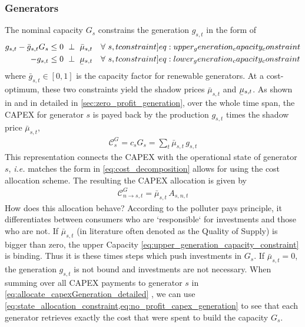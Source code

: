 \documentclass[11pt,twocolumn]{article}
\newcommand{\ie}{\textit{i.e.} }
\newcommand{\ubar}[1]{\underaccent{\bar}{#1}}
\newcommand{\resultsin}[1]{\hspace{6pt} \bot  \hspace{6pt} #1}
\newcommand{\Forall}[1]{\hspace{10pt} \forall \,\, #1 }
\newcommand{\generation}{g_{s,t}}
\newcommand{\generationpotential}{\bar{g}_{s,t}}
\newcommand{\capacitygeneration}{G_{s}}
\newcommand{\capitalpricegeneration}{c_{s}}
\newcommand{\mulowergeneration}{\ubar{\mu}_{s,t}}
\newcommand{\muuppergeneration}{\bar{\mu}_{s,t}}
\newcommand{\capexgeneration}{\mathcal{C}^G}
\newcommand{\allocategeneration}[1][s, n]{A_{#1,t}}
\newcommand{\allocatecapexgeneration}[1][n \rightarrow s]{\capexgeneration_{#1,t}}
\begin{document}
\subsubsection{Generators}

The nominal capacity $\capacitygeneration$ constrains the generation $\generation$ in the form of 
\begin{align}
\generation - \generationpotential \capacitygeneration  &\le 0 \resultsin{\muuppergeneration} \Forall{s,t} 
\label[constraint]{eq:upper_generation_capacity_constraint}\\ 
- \generation &\le 0 \resultsin{\mulowergeneration} \Forall{s,t} 
\label[constraint]{eq:lower_generation_capacity_constraint}
\end{align}
where $\generationpotential \in \left[ 0,1\right]$ is the capacity factor for renewable generators. At a cost-optimum, these two constraints yield the shadow prices $\muuppergeneration$ and $\mulowergeneration$.  As shown in \cite{brown_decreasing_2020} and in detailed in \cref{sec:zero_profit_generation}, over the whole time span, the CAPEX for generator $s$ is payed back by the production $\generation$ times the shadow price $\muuppergeneration$, 
\begin{align}
 \capexgeneration_s = \capitalpricegeneration \capacitygeneration = \sum_t \muuppergeneration \,  \generation 
 \label{eq:no_profit_capex_generation}
\end{align}
This representation connects the CAPEX with the operational state of generator $s$, \ie matches the form in \cref{eq:cost_decomposition} allows for using the cost allocation scheme. The resulting the CAPEX allocation is given by
\begin{align}
 \allocatecapexgeneration = \muuppergeneration \, \allocategeneration
 \label{eq:allocate_capexGeneration_detailed}
\end{align}
How does this allocation behave? According to the polluter pays principle, it differentiates between consumers who are `responsible` for investments and those who are not. If $\muuppergeneration$ (in literature often denoted as the Quality of Supply) is bigger than zero, the upper Capacity \cref{eq:upper_generation_capacity_constraint} is binding. Thus it is these times steps which push investments in $\capacitygeneration$. If $\muuppergeneration = 0$, the generation $\generation$ is not bound and investments are not necessary. 
When summing over all CAPEX payments to generator $s$ in \cref{eq:allocate_capexGeneration_detailed} , we can use \cref{eq:state_allocation_constraint,eq:no_profit_capex_generation} to see that each generator retrieves exactly the cost that were spent to build the capacity $\capacitygeneration$.
 
\end{document}
